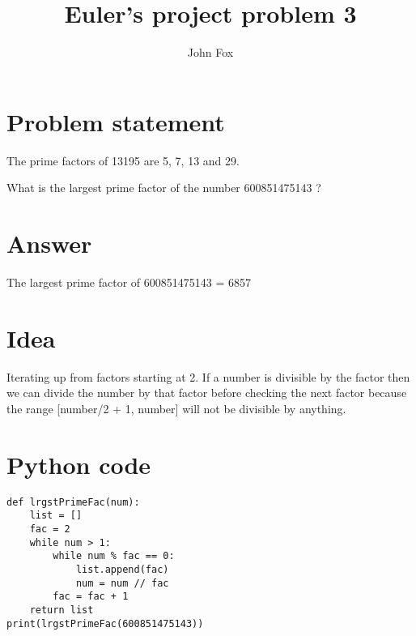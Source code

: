 \documentclass{article}
\title{Euler's project problem 3}
\author{John Fox}
\begin{document}
\maketitle


\section*{Problem statement} 
The prime factors of 13195 are 5, 7, 13 and 29.

What is the largest prime factor of the number 600851475143 ?

\section*{Answer}
The largest prime factor of 600851475143 = 6857
\section*{Idea} Iterating up from factors starting at 2. If a number is divisible by the factor then we can divide the number by that factor before checking the next factor because the range [number/2 + 1, number] will not be divisible by anything. 

\section*{Python code}
\begin{verbatim}
def lrgstPrimeFac(num):
    list = []
    fac = 2
    while num > 1:
        while num % fac == 0:
            list.append(fac)
            num = num // fac
        fac = fac + 1
    return list
print(lrgstPrimeFac(600851475143))
\end{verbatim}
\end{document}
